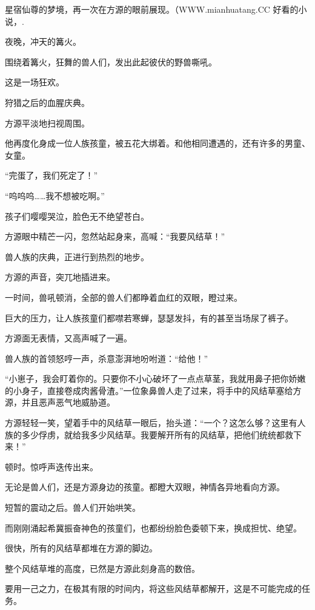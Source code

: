 
\begin{this_body}

星宿仙尊的梦境，再一次在方源的眼前展现。（WWW.mianhuatang.CC 好看的小说，.

夜晚，冲天的篝火。

围绕着篝火，狂舞的兽人们，发出此起彼伏的野兽嘶吼。

这是一场狂欢。

狩猎之后的血腥庆典。

方源平淡地扫视周围。

他再度化身成一位人族孩童，被五花大绑着。和他相同遭遇的，还有许多的男童、女童。

“完蛋了，我们死定了！”

“呜呜呜……我不想被吃啊。”

孩子们嘤嘤哭泣，脸色无不绝望苍白。

方源眼中精芒一闪，忽然站起身来，高喊：“我要风结草！”

兽人族的庆典，正进行到热烈的地步。

方源的声音，突兀地插进来。

一时间，兽吼顿消，全部的兽人们都睁着血红的双眼，瞪过来。

巨大的压力，让人族孩童们都噤若寒蝉，瑟瑟发抖，有的甚至当场尿了裤子。

方源面无表情，又高声喊了一遍。

兽人族的首领怒哼一声，杀意澎湃地吩咐道：“给他！”

“小崽子，我会盯着你的。只要你不小心破坏了一点点草茎，我就用鼻子把你娇嫩的小身子，直接卷成肉酱骨渣。”一位象鼻兽人走了过来，将手中的风结草塞给方源，并且恶声恶气地威胁道。

方源轻轻一笑，望着手中的风结草一眼后，抬头道：“一个？这怎么够？这里有人族的多少俘虏，就给我多少风结草。我要解开所有的风结草，把他们统统都救下来！”

顿时。惊呼声迭传出来。

无论是兽人们，还是方源身边的孩童。都瞪大双眼，神情各异地看向方源。

短暂的震动之后。兽人们开始哄笑。

而刚刚涌起希冀振奋神色的孩童们，也都纷纷脸色委顿下来，换成担忧、绝望。

很快，所有的风结草都堆在方源的脚边。

整个风结草堆的高度，已然是方源此刻身高的数倍。

要用一己之力，在极其有限的时间内，将这些风结草都解开，这是不可能完成的任务。


\end{this_body}
